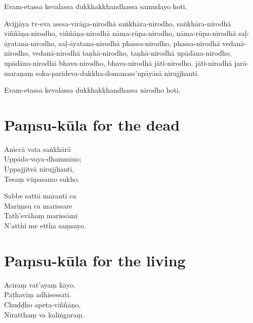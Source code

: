 Evam-etassa kevalassa dukkhakkhandhassa samudayo hoti.

Avijjāya tv-eva asesa-virāga-nirodhā saṅkhāra-nirodho, saṅkhāra-nirodhā
viññāṇa-nirodho, viññāṇa-nirodhā nāma-rūpa-nirodho, nāma-rūpa-nirodhā
saḷ-āyatana-nirodho, saḷ-āyatana-nirodhā phassa-nirodho, phassa-nirodhā
vedanā-nirodho, vedanā-nirodhā taṇhā-nirodho, taṇhā-nirodhā
upādāna-nirodho, upādāna-nirodhā bhava-nirodho, bhava-nirodhā
jāti-nirodho, jāti-nirodhā jarā-maraṇaṃ
soka-parideva-dukkha-domanass'upāyāsā nirujjhanti.

Evam-etassa kevalassa dukkhakkhandhassa nirodho hoti.

\clearpage

\chapter{Paṃsu-kūla for the dead}%


\begin{paritta}
Aniccā vata saṅkhārā\\
Uppāda-vaya-dhammino;\\
Uppajjitvā nirujjhanti,\\
Tesaṃ vūpasamo sukho.

Sabbe sattā maranti ca\\
Mariṃsu ca marissare\\
Tath'evāhaṃ marissāmi\\
N'atthi me ettha saṃsayo.

\end{paritta}

\chapter{Paṃsu-kūla for the living}%


\begin{paritta}
Aciraṃ vat'ayaṃ kāyo,\\
Paṭhaviṃ adhisessati.\\
Chuḍḍho apeta-viññāṇo,\\
Niratthaṃ va kaliṅgaraṃ.

\end{paritta}

